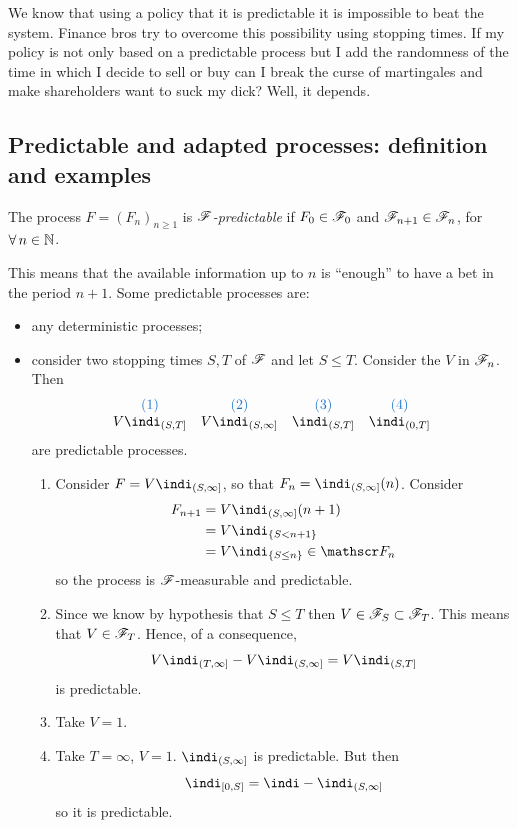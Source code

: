 \documentclass{report}
\begin{document}
We know that using a policy that it is predictable it is impossible to beat the system. Finance bros try to overcome this possibility using stopping times. If my policy is not only based on a predictable process but I add the randomness of the time in which I decide to sell or buy can I break the curse of martingales and make shareholders want to suck my dick? Well, it depends.
\subsection{Predictable and adapted processes: definition and examples}
\begin{definition}
	The process $F={(F_{n})}_{n\geq1}$ is \emph{$\mathscr{F}$-predictable} if $F_{0}\in\mathscr{F}_{0}$ and $\mathscr{F}_{n+1}\in\mathscr{F}_{n}$, for $\forall\, n\in\mathbb{N}$.
\end{definition}
This means that the available information up to $n$ is ``enough'' to have a bet in the period $n+1$. Some predictable processes are:
\begin{itemize}
	\item any deterministic processes;
	\item consider two stopping times $S,T$ of $\mathscr{F}$ and let $S\leq T$. Consider the \rv{} $V$ in $\mathscr{F}_{n}$. Then
	\[\begin{array}{c c c c}
		\color{DodgerBlue3}(1)&\color{DodgerBlue3}(2)&\color{DodgerBlue3}(3)&\color{DodgerBlue3}(4)\\
		V\indi_{(S,T]}&V\indi_{(S,\infty]}&\indi_{(S,T]}&\indi_{(0,T]}
	\end{array}\]
	are predictable processes.
	\begin{fancyproof}
		\begin{enumerate}
			\item[\color{DodgerBlue3}(2)] Consider $F=V\indi_{(S,\infty]}$, so that $F_{n}=\indi_{(S,\infty]}(n)$. Consider \begin{align*}
				F_{n+1}&=V\indi_{(S,\infty]}(n+1)\\
				&=V\indi_{\{S<n+1\}}\\
				&=V\indi_{\{S\leq n\}}\in\F_{n}
			\end{align*}
			so the process is $\mathscr{F}$-measurable and predictable.
			\item[\color{DodgerBlue4}(1)] Since we know by hypothesis that $S\leq T$ then $V\in\mathscr{F}_{S}\subset\mathscr{F}_{T}$. This means that $V\in\mathscr{F}_{T}$. Hence, of a consequence,
			\begin{equation*}
				V\indi_{(T,\infty]}-V\indi_{(S,\infty]}=V\indi_{(S,T]}
			\end{equation*}
			is predictable.
			\item[\color{DodgerBlue3}(3)] Take $V=1$.
			\item[\color{DodgerBlue3}(4)] Take $T=\infty$, $V=1$. $\indi_{(S,\infty]}$ is predictable. But then 
			\[\indi_{[0,S]}=\indi-\indi_{(S,\infty]}\]
			so it is predictable.
		\end{enumerate}
	\end{fancyproof}
\end{itemize} 
\end{document}
